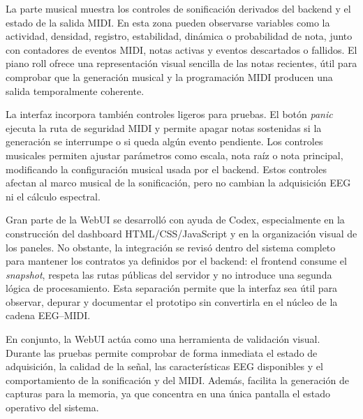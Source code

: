 \documentclass[../main.tex]{subfiles}
\begin{document}
La parte musical muestra los controles de sonificación derivados del backend y el estado de la salida MIDI. En esta zona pueden observarse variables como la actividad, densidad, registro, estabilidad, dinámica o probabilidad de nota, junto con contadores de eventos MIDI, notas activas y eventos descartados o fallidos. El piano roll ofrece una representación visual sencilla de las notas recientes, útil para comprobar que la generación musical y la programación MIDI producen una salida temporalmente coherente.

La interfaz incorpora también controles ligeros para pruebas. El botón \textit{panic} ejecuta la ruta de seguridad MIDI y permite apagar notas sostenidas si la generación se interrumpe o si queda algún evento pendiente. Los controles musicales permiten ajustar parámetros como escala, nota raíz o nota principal, modificando la configuración musical usada por el backend. Estos controles afectan al marco musical de la sonificación, pero no cambian la adquisición EEG ni el cálculo espectral.

Gran parte de la WebUI se desarrolló con ayuda de Codex, especialmente en la construcción del dashboard HTML/CSS/JavaScript y en la organización visual de los paneles. No obstante, la integración se revisó dentro del sistema completo para mantener los contratos ya definidos por el backend: el frontend consume el \textit{snapshot}, respeta las rutas públicas del servidor y no introduce una segunda lógica de procesamiento. Esta separación permite que la interfaz sea útil para observar, depurar y documentar el prototipo sin convertirla en el núcleo de la cadena EEG--MIDI.

En conjunto, la WebUI actúa como una herramienta de validación visual. Durante las pruebas permite comprobar de forma inmediata el estado de adquisición, la calidad de la señal, las características EEG disponibles y el comportamiento de la sonificación y del MIDI. Además, facilita la generación de capturas para la memoria, ya que concentra en una única pantalla el estado operativo del sistema.
\end{document}
